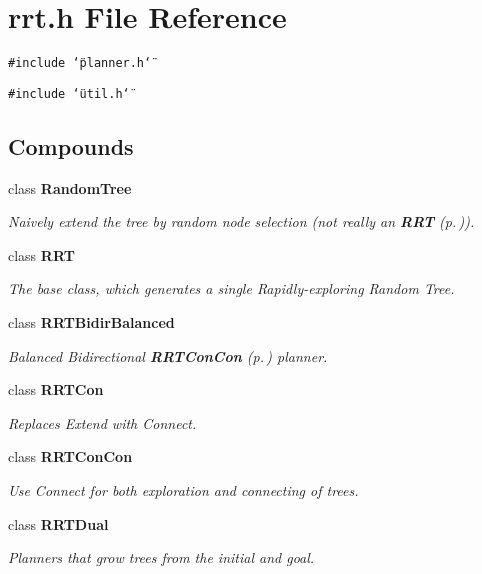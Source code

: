 \section{rrt.h File Reference}
\label{rrt_8h}
{\tt \#include \char`\"{}planner.h\char`\"{}}\par
{\tt \#include \char`\"{}util.h\char`\"{}}\par
\subsection*{Compounds}
\begin{CompactItemize}
\item 
class {\bf Random\-Tree}
\begin{CompactList}\small\item\em Naively extend the tree by random node selection (not really an {\bf RRT} {\rm (p.\,\pageref{classRRT})}).\item\end{CompactList}\item 
class {\bf RRT}
\begin{CompactList}\small\item\em The base class, which generates a single Rapidly-exploring Random Tree.\item\end{CompactList}\item 
class {\bf RRTBidir\-Balanced}
\begin{CompactList}\small\item\em Balanced Bidirectional {\bf RRTCon\-Con} {\rm (p.\,\pageref{classRRTConCon})} planner.\item\end{CompactList}\item 
class {\bf RRTCon}
\begin{CompactList}\small\item\em Replaces Extend with Connect.\item\end{CompactList}\item 
class {\bf RRTCon\-Con}
\begin{CompactList}\small\item\em Use Connect for both exploration and connecting of trees.\item\end{CompactList}\item 
class {\bf RRTDual}
\begin{CompactList}\small\item\em Planners that grow trees from the initial and goal.\item\end{CompactList}\item 

\end{CompactItemize}
